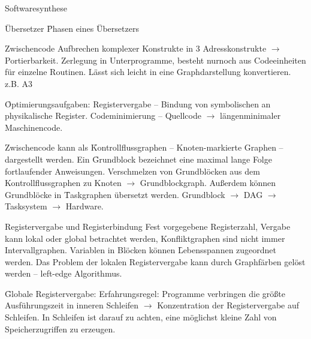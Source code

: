 \begin{chapter}{Softwaresynthese}
\begin{section}{Übersetzer}
 \f{Phasen eines Übersetzers}
 
 \begin{subsection}{Zwischencode}
  Aufbrechen komplexer Konstrukte in 3 Adresskonstrukte $\rightarrow$ Portierbarkeit. Zerlegung in Unterprogramme, besteht nurnoch aus Codeeinheiten für einzelne Routinen. Lässt sich leicht in eine Graphdarstellung konvertieren. z.B. A3 
 
 \f{Optimierungsaufgaben:} Registervergabe -- Bindung von symbolischen an physikalische Register. Codeminimierung -- Quellcode $\rightarrow$ längenminimaler Maschinencode. 
 
 Zwischencode kann als \f{Kontrollflussgraphen} -- Knoten-markierte Graphen -- dargestellt werden. Ein \f{Grundblock} bezeichnet eine maximal lange Folge fortlaufender Anweisungen. Verschmelzen von Grundblöcken aus dem Kontrollflussgraphen zu Knoten $\rightarrow$ Grundblockgraph. Außerdem können Grundblöcke in \f{Taskgraphen} übersetzt werden. Grundblock $\rightarrow$ DAG $\rightarrow$ Tasksystem $\rightarrow$ Hardware.
 \end{subsection}
\end{section}
\begin{section}{Registervergabe und Registerbindung}
 Fest vorgegebene Registerzahl, Vergabe kann lokal oder global betrachtet werden, Konfliktgraphen sind nicht immer Intervallgraphen. Variablen in Blöcken können \f{Lebensspannen} zugeordnet werden. Das Problem der lokalen Registervergabe kann durch Graphfärben gelöst werden -- left-edge Algorithmus. 
 
 \f{Globale Registervergabe:} Erfahrungsregel: Programme verbringen die größte Ausführungszeit in inneren Schleifen $\rightarrow$ Konzentration der Registervergabe auf Schleifen. In Schleifen ist darauf zu achten, eine möglichst kleine Zahl von Speicherzugriffen zu erzeugen.  

\end{section}
\end{chapter}
